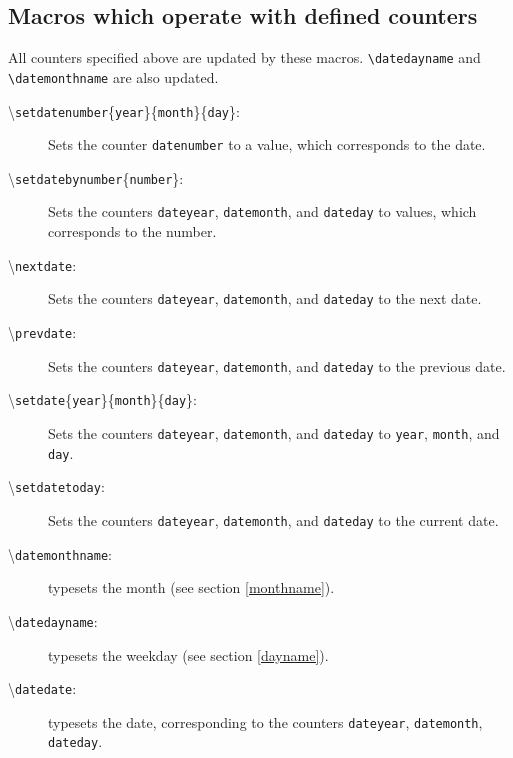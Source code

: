 \documentclass[draft]{article}
\begin{document}
\subsection{Macros which operate with defined counters\label{macro}}
All counters specified above are updated by these macros. \verb+\datedayname+ and \verb+\datemonthname+ are also updated.
\begin{description}
\item[{\mdseries\textbackslash}\texttt{setdatenumber}\{\texttt{year}\}\{\texttt{month}\}\{\texttt{day}\}:] Sets the counter \texttt{datenumber} to a value, which corresponds to the date.
\item[{\mdseries\textbackslash}\texttt{setdatebynumber}\{\texttt{number}\}:] Sets the counters \texttt{dateyear}, \texttt{datemonth}, and \texttt{dateday} to values, which corresponds to the number.
\item[{\mdseries\textbackslash}\texttt{nextdate}:] Sets the counters \texttt{dateyear}, \texttt{datemonth}, and \texttt{dateday} to the next date.
\item[{\mdseries\textbackslash}\texttt{prevdate}:] Sets the counters \texttt{dateyear}, \texttt{datemonth}, and \texttt{dateday} to the previous date.
\item[{\mdseries\textbackslash}\texttt{setdate}\{\texttt{year}\}\{\texttt{month}\}\{\texttt{day}\}:] Sets the counters \texttt{dateyear}, \texttt{datemonth}, and \texttt{dateday} to \texttt{year}, \texttt{month}, and \texttt{day}.
\item[{\mdseries\textbackslash}\texttt{setdatetoday}:] Sets the counters \texttt{dateyear}, \texttt{datemonth}, and \texttt{dateday} to the current date.
\item[{\mdseries\textbackslash}\texttt{datemonthname}:] typesets the month (see section \ref{monthname}).
\item[{\mdseries\textbackslash}\texttt{datedayname}:] typesets the weekday (see section \ref{dayname}).
\item[{\mdseries\textbackslash}\texttt{datedate}:] typesets the date, corresponding to the counters \texttt{dateyear}, \texttt{datemonth}, \texttt{dateday}.
\end{description}
\end{document}
